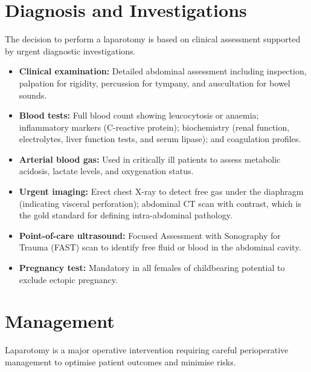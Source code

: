 \section*{Diagnosis and Investigations}
The decision to perform a laparotomy is based on clinical assessment supported by urgent diagnostic investigations.

\begin{itemize}
    \item \textbf{Clinical examination:} Detailed abdominal assessment including inspection, palpation for rigidity, percussion for tympany, and auscultation for bowel sounds.
    \item \textbf{Blood tests:} Full blood count showing leucocytosis or anaemia; inflammatory markers (C-reactive protein); biochemistry (renal function, electrolytes, liver function tests, and serum lipase); and coagulation profiles.
    \item \textbf{Arterial blood gas:} Used in critically ill patients to assess metabolic acidosis, lactate levels, and oxygenation status.
    \item \textbf{Urgent imaging:} Erect chest X-ray to detect free gas under the diaphragm (indicating visceral perforation); abdominal CT scan with contrast, which is the gold standard for defining intra-abdominal pathology.
    \item \textbf{Point-of-care ultrasound:} Focused Assessment with Sonography for Trauma (FAST) scan to identify free fluid or blood in the abdominal cavity.
    \item \textbf{Pregnancy test:} Mandatory in all females of childbearing potential to exclude ectopic pregnancy.
\end{itemize}

\section*{Management}
Laparotomy is a major operative intervention requiring careful perioperative management to optimise patient outcomes and minimise risks.

